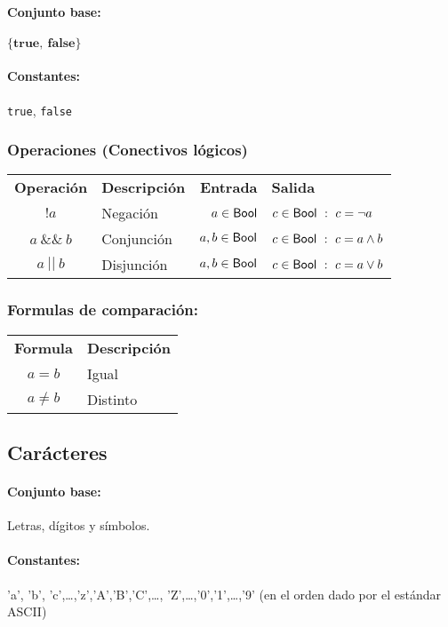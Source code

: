 \paragraph{Conjunto base:} $\{\textbf{true},~ \textbf{false}\}$

\paragraph{Constantes:} \texttt{true}, \texttt{false}

\subsubsection*{Operaciones (Conectivos lógicos)}
\begin{tabular}{clrl}
	\textbf{Operación} & \textbf{Descripción} & \textbf{Entrada} & \textbf{Salida} \\
	$!a$ &  Negación & $a\in \mathsf{Bool}$ & $c\in\mathsf{Bool}~:~c = \lnot a$\\
	$a~\&\&~b$ &  Conjunción & $a, b \in \mathsf{Bool}$ & $c\in\mathsf{Bool}~:~c = a \land b$\\
	$a~||~b$ &  Disjunción & $a, b \in \mathsf{Bool}$ & $c\in\mathsf{Bool}~:~c = a \lor b$ \\
\end{tabular}

\subsubsection*{Formulas de comparación:}
\begin{tabular}{cl}
	\textbf{Formula} & \textbf{Descripción} \\
	$a = b$ & Igual\\
	$a \neq b$ & Distinto \\
\end{tabular}

\subsection{Carácteres}

\paragraph{Conjunto base:} Letras, dígitos y símbolos.

\paragraph{Constantes:} 'a', 'b', 'c',\dots,'z','A','B','C',\dots, 'Z',\dots,'0','1',\dots,'9' (en el orden dado por el estándar ASCII)

